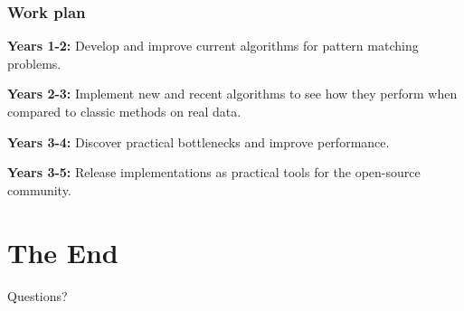 \documentclass{beamer}
\begin{document}

\begin{frame}
\frametitle{Work plan}
\textbf{Years 1-2:} Develop and improve current algorithms for pattern matching problems.

\textbf{Years 2-3:} Implement new and recent algorithms to see how they perform when compared to classic methods on real data.

\textbf{Years 3-4:} Discover practical bottlenecks and improve performance.

\textbf{Years 3-5:} Release implementations as practical tools for the open-source community.
\end{frame}

\section{The End}

\begin{frame}
\Huge{\centerline{Questions?}}
\end{frame}

\end{document}
